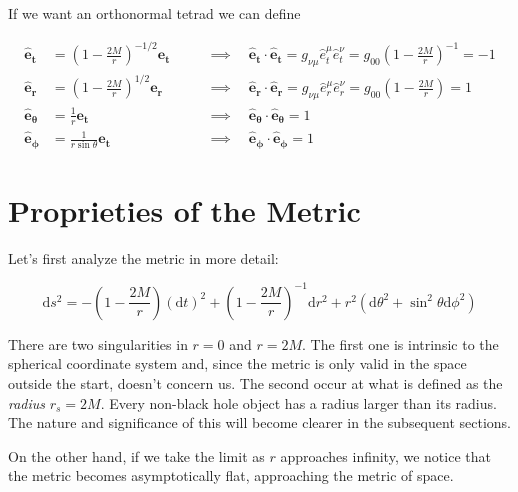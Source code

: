 If we want an orthonormal tetrad we can define

\begin{subequations}
\begin{align}
    \mathbf{\hat e_t} &= \left(1 - \frac{2M}{r}\right)^{-1/2} \mathbf{e_t}
    \quad &&\implies \quad
    \mathbf{\hat e_t \cdot \hat e_t} = g_{\nu \mu} \hat e_t^\mu \hat e_t^\nu
    = g_{00} \left(1 - \frac{2M}{r}\right)^{-1} = - 1
    \label{cap1:eq:local_ON_base_t}\\
    \mathbf{\hat e_r} &= \left(1 - \frac{2M}{r}\right)^{1/2} \mathbf{e_r}
    \quad &&\implies \quad
    \mathbf{\hat e_r \cdot \hat e_r} = g_{\nu \mu} \hat e_r^\mu \hat e_r^\nu
    = g_{00} \left(1 - \frac{2M}{r}\right) = 1 \\
    \mathbf{\hat e_\theta} &= \frac{1}{r} \mathbf{e_t}
    \quad &&\implies \quad
    \mathbf{\hat e_\theta \cdot \hat e_\theta} = 1 \\
    \mathbf{\hat e_\phi} &= \frac{1}{r \sin \theta} \mathbf{e_t}
    \quad &&\implies \quad
    \mathbf{\hat e_\phi \cdot \hat e_\phi} = 1
\end{align}
    \label{cap1:eq:local_ON_base}
\end{subequations}

\newpage


\section{Proprieties of the Metric}

Let's first analyze the \Sh metric in more detail:

\begin{equation}
    \mathrm{d}s^2 = - \left(1 - \frac{2 M}{r} \right) (\mathrm{d}t)^2
    + \left(1 - \frac{2 M}{r} \right)^{-1} \mathrm{d}r^2
    + r^2 (\mathrm{d}\theta^2 + \sin^2 \theta \mathrm{d}\phi^2)
    \label{cap1:eq:Sh_ds}
\end{equation}

There are two singularities in $r = 0$ and $r = 2M$.
The first one is intrinsic to the spherical coordinate system and, since the
metric is only valid in the space outside the start, doesn't concern us.
The second occur at what is defined as the \textit{\Sh radius} $r_s = 2M$.
Every non-black hole object has a radius larger than its \Sh radius.
The nature and significance of this will become clearer in the subsequent
sections.

On the other hand, if we take the limit as $r$ approaches infinity, we notice
that the
metric becomes asymptotically flat, approaching the metric of \Mi space.


